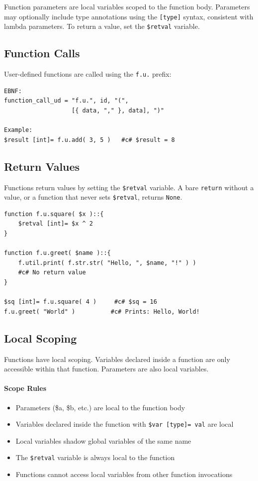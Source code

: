 Function parameters are local variables scoped to the function body. Parameters may optionally include type annotations using the \texttt{[type]} syntax, consistent with lambda parameters. To return a value, set the \texttt{\$retval} variable.

\subsection{Function Calls}
User-defined functions are called using the \texttt{f.u.} prefix:
\begin{verbatim}
EBNF:
function_call_ud = "f.u.", id, "(", 
                   [{ data, "," }, data], ")"

Example:
$result [int]= f.u.add( 3, 5 )   #c# $result = 8
\end{verbatim}

\subsection{Return Values}
Functions return values by setting the \texttt{\$retval} variable. A bare \texttt{return} without a value, or a function that never sets \texttt{\$retval}, returns \texttt{None}.
\begin{verbatim}
function f.u.square( $x )::{
    $retval [int]= $x ^ 2
}

function f.u.greet( $name )::{
    f.util.print( f.str.str( "Hello, ", $name, "!" ) )
    #c# No return value
}

$sq [int]= f.u.square( 4 )     #c# $sq = 16
f.u.greet( "World" )          #c# Prints: Hello, World!
\end{verbatim}

\subsection{Local Scoping}
\label{sec:function-scope}
Functions have local scoping. Variables declared inside a function are only accessible within that function. Parameters are also local variables.

\paragraph{Scope Rules}
\begin{itemize}
\item Parameters (\$a, \$b, etc.) are local to the function body
\item Variables declared inside the function with \texttt{\$var [type]= val} are local
\item Local variables shadow global variables of the same name
\item The \texttt{\$retval} variable is always local to the function
\item Functions cannot access local variables from other function invocations
\end{itemize}

